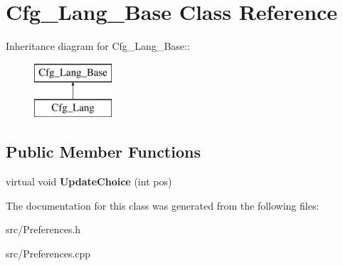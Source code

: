 \section{Cfg\_\-Lang\_\-Base Class Reference}
\label{classCfg__Lang__Base}
Inheritance diagram for Cfg\_\-Lang\_\-Base::\begin{figure}[H]
\begin{center}
\leavevmode
\includegraphics[height=2cm]{classCfg__Lang__Base}
\end{center}
\end{figure}
\subsection*{Public Member Functions}
\begin{DoxyCompactItemize}
\item 
virtual void {\bfseries UpdateChoice} (int pos)\label{classCfg__Lang__Base_a774627a0f8426b7ad912bfdedbdef10d}

\end{DoxyCompactItemize}


The documentation for this class was generated from the following files:\begin{DoxyCompactItemize}
\item 
src/Preferences.h\item 
src/Preferences.cpp\end{DoxyCompactItemize}
